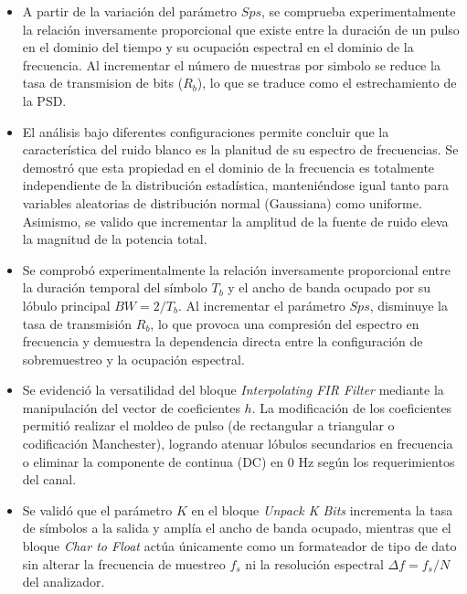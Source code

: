 \documentclass[twocolumn]{IEEEtran}
\begin{document}
\begin{itemize}
    \item A partir de la variación del parámetro $Sps$, se comprueba experimentalmente la relación inversamente proporcional que existe entre la duración de un pulso en el dominio del tiempo y su ocupación espectral en el dominio de la frecuencia. Al incrementar el número de muestras por simbolo se reduce la tasa de transmision de bits ($R_b$), lo que se traduce como el estrechamiento de la PSD.
    \item El análisis bajo diferentes configuraciones permite concluir que la característica del ruido blanco es la planitud de su espectro de frecuencias. Se demostró que esta propiedad en el dominio de la frecuencia es totalmente independiente de la distribución estadística, manteniéndose igual tanto para variables aleatorias de distribución normal (Gaussiana) como uniforme. Asimismo, se valido que incrementar la amplitud de la fuente de ruido eleva la magnitud de la potencia total.
    
    \item Se comprobó experimentalmente la relación inversamente proporcional entre la duración temporal del símbolo $T_b$ y el ancho de banda ocupado por su lóbulo principal $BW = 2/T_b$. Al incrementar el parámetro $Sps$, disminuye la tasa de transmisión $R_b$, lo que provoca una compresión del espectro en frecuencia y demuestra la dependencia directa entre la configuración de sobremuestreo y la ocupación espectral.

    \item Se evidenció la versatilidad del bloque \textit{Interpolating FIR Filter} mediante la manipulación del vector de coeficientes $h$. La modificación de los coeficientes permitió realizar el moldeo de pulso (de rectangular a triangular o codificación Manchester), logrando atenuar lóbulos secundarios en frecuencia o eliminar la componente de continua (DC) en 0 Hz según los requerimientos del canal.

    \item Se validó que el parámetro $K$ en el bloque \textit{Unpack K Bits} incrementa la tasa de símbolos a la salida y amplía el ancho de banda ocupado, mientras que el bloque \textit{Char to Float} actúa únicamente como un formateador de tipo de dato sin alterar la frecuencia de muestreo $f_s$ ni la resolución espectral $\Delta f = f_s/N$ del analizador.

\end{itemize}

\end{document}
